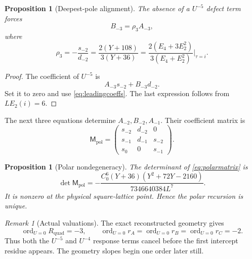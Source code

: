 \documentclass[11pt]{article}
\newtheorem{proposition}[theorem]{Proposition}
\theoremstyle{definition}
\theoremstyle{remark}
\newtheorem{remark}[theorem]{Remark}
\newcommand{\ord}{\operatorname{ord}}
\begin{document}
\begin{proposition}[Deepest-pole alignment]\label{prop:rho}
The absence of a $U^{-5}$ defect term forces
\begin{equation}\label{eq:rhorelation}
 B_{-3}=\rho_3A_{-3},
\end{equation}
where
\begin{equation}\label{eq:rho}
 \boxed{
 \rho_3=-\frac{s_{-2}}{d_{-2}}
 =\frac{2(Y+108)}{3(Y+36)}
 =\frac{2(E_4+3E_2^2)}{3(E_4+E_2^2)}\bigg|_{\tau=i}.
 }
\end{equation}
\end{proposition}

\begin{proof}
The coefficient of $U^{-5}$ is
\[
 A_{-3}s_{-2}+B_{-3}d_{-2}.
\]
Set it to zero and use \eqref{eq:leadingcoeffs}.  The last expression follows from $LE_2(i)=6$.
\end{proof}

The next three equations determine $A_{-2},B_{-2},A_{-1}$.  Their coefficient matrix is
\begin{equation}\label{eq:polarmatrix}
 \mathsf M_{\mathrm{pol}}=
 \begin{pmatrix}
 s_{-2}&d_{-2}&0\\
 s_{-1}&d_{-1}&s_{-2}\\
 s_0&0&s_{-1}
 \end{pmatrix}.
\end{equation}

\begin{proposition}[Polar nondegeneracy]\label{prop:polar}
The determinant of \eqref{eq:polarmatrix} is
\begin{equation}\label{eq:polardet}
 \det\mathsf M_{\mathrm{pol}}
 =-\frac{C_0^6(Y+36)(Y^2+72Y-2160)}{7346640384L^7}.
\end{equation}
It is nonzero at the physical square-lattice point.  Hence the polar recursion is unique.
\end{proposition}

\begin{remark}[Actual valuations]
The exact reconstructed geometry gives
\begin{equation}\label{eq:valuations}
 \ord_{U=0}R_{\mathrm{quad}}=-3,
 \qquad
 \ord_{U=0}r_A
 =\ord_{U=0}r_B
 =\ord_{U=0}r_C=-2.
\end{equation}
Thus both the $U^{-5}$ and $U^{-4}$ response terms cancel before the first intercept residue appears.  The geometry slopes begin one order later still.
\end{remark}
\end{document}
